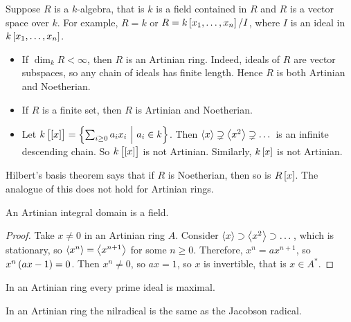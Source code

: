 \pagebreak


\begin{example}
Suppose $ R $ is a $ k $-algebra, that is $ k $ is a field contained in $ R $ and $ R $ is a vector space over $ k $. For example, $ R = k $ or $ R = k\sbr{x_1, \dots, x_n} / I $, where $ I $ is an ideal in $ k\sbr{x_1, \dots, x_n} $.
\begin{itemize}
\item If $ \dim_k R < \infty $, then $ R $ is an Artinian ring. Indeed, ideals of $ R $ are vector subspaces, so any chain of ideals has finite length. Hence $ R $ is both Artinian and Noetherian.
\item If $ R $ is a finite set, then $ R $ is Artinian and Noetherian.
\item Let $ k\sbr{\sbr{x}} = \cbr{\sum_{i \ge 0} a_ix_i \st a_i \in k} $. Then $ \left\langle x \right\rangle \supsetneq \left\langle x^2 \right\rangle \supsetneq \dots $ is an infinite descending chain. So $ k\sbr{\sbr{x}} $ is not Artinian. Similarly, $ k\sbr{x} $ is not Artinian.
\end{itemize}
\end{example}

\begin{remark*}
Hilbert's basis theorem says that if $ R $ is Noetherian, then so is $ R\sbr{x} $. The analogue of this does not hold for Artinian rings.
\end{remark*}

\begin{lemma}
An Artinian integral domain is a field.
\end{lemma}

\begin{proof}
Take $ x \ne 0 $ in an Artinian ring $ A $. Consider $ \left\langle x \right\rangle \supset \left\langle x^2 \right\rangle \supset \dots $, which is stationary, so $ \left\langle x^n \right\rangle = \left\langle x^{n + 1} \right\rangle $ for some $ n \ge 0 $. Therefore, $ x^n = ax^{n + 1} $, so $ x^n\br{ax - 1} = 0 $. Then $ x^n \ne 0 $, so $ ax = 1 $, so $ x $ is invertible, that is $ x \in A^* $.
\end{proof}

\begin{corollary}
\label{cor:13.7}
In an Artinian ring every prime ideal is maximal.
\end{corollary}

\begin{corollary}
In an Artinian ring the nilradical is the same as the Jacobson radical.
\end{corollary}

